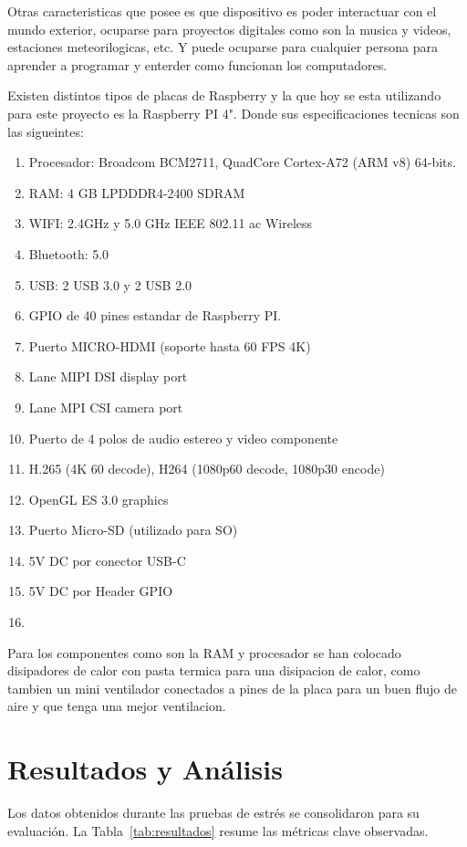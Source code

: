 \documentclass[11pt, a4paper]{article}
\begin{document}
Otras caracteristicas que posee es que dispositivo es poder interactuar con el mundo exterior, ocuparse para proyectos digitales como son la musica y videos, estaciones meteorilogicas, etc. Y puede ocuparse para cualquier persona para aprender a programar y enterder como funcionan los computadores.

Existen distintos tipos de placas de Raspberry y la que hoy se esta utilizando para este proyecto es la Raspberry PI 4". Donde sus especificaciones tecnicas son las sigueintes:
\begin{enumerate}
    \item Procesador: Broadcom BCM2711, QuadCore Cortex-A72 (ARM v8) 64-bits.
    \item RAM: 4 GB LPDDDR4-2400 SDRAM
    \item WIFI: 2.4GHz y 5.0 GHz IEEE 802.11 ac Wireless
    \item Bluetooth: 5.0
    \item USB: 2 USB 3.0 y 2 USB 2.0
    \item GPIO de 40 pines estandar de Raspberry PI.
    \item Puerto MICRO-HDMI (soporte hasta 60 FPS 4K)
    \item Lane MIPI DSI display port
    \item Lane MPI CSI camera port
    \item Puerto de 4 polos de audio estereo y video componente
    \item H.265 (4K 60 decode), H264 (1080p60 decode, 1080p30 encode)
    \item OpenGL ES 3.0 graphics
    \item Puerto Micro-SD (utilizado para SO) 
    \item 5V DC por conector USB-C
    \item 5V DC por Header GPIO
    \item
\end{enumerate}

Para los componentes como son la RAM y procesador se han colocado disipadores de calor con pasta termica para una disipacion de calor, como tambien un mini ventilador conectados a pines de la placa para un buen flujo de aire y que tenga una mejor ventilacion.

\section{Resultados y Análisis}
Los datos obtenidos durante las pruebas de estrés se consolidaron para su evaluación. La Tabla~\ref{tab:resultados} resume las métricas clave observadas.
\end{document}

